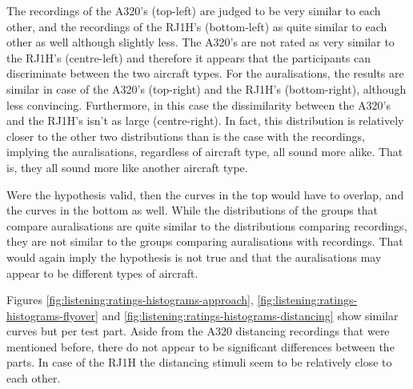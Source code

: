 The recordings of the A320's (top-left) are judged to be very similar to each other, and
the recordings of the RJ1H's (bottom-left) as quite similar to each other as well although
slightly less. The A320's are not rated as very similar to the RJ1H's (centre-left) and
therefore it appears that the participants can discriminate between the two
aircraft types.
For the auralisations, the results are similar in case of the A320's (top-right)
and the RJ1H's (bottom-right), although less convincing. Furthermore, in this case the
dissimilarity between the A320's and the RJ1H's isn't as large (centre-right). In fact, this
distribution is relatively closer to the other two distributions than is the
case with the recordings, implying the auralisations, regardless of aircraft
type, all sound more alike. That is, they all sound more like another aircraft type.

%

Were the hypothesis valid, then the curves in the top would have to overlap, and
the curves in the bottom as well. While the distributions of the groups that
compare auralisations are quite similar to the distributions comparing
recordings, they are not similar to the groups comparing auralisations with
recordings. That would again imply the hypothesis is not true and that the
auralisations may appear to be different types of aircraft.


Figures \ref{fig:listening:ratings-histograms-approach},
\ref{fig:listening:ratings-histograms-flyover} and
\ref{fig:listening:ratings-histograms-distancing} show similar curves but per
test part. Aside from the A320 distancing recordings that were mentioned before,
there do not appear to be significant differences between the parts.
In case of the RJ1H the distancing stimuli seem to be relatively close to each other.


